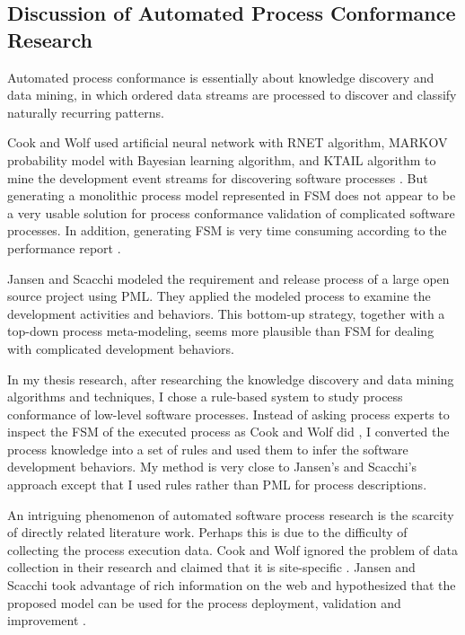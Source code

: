 \subsection{Discussion of Automated Process Conformance Research}
Automated process conformance is essentially about 
knowledge discovery and data mining, in which ordered 
data streams are processed to discover and classify 
naturally recurring patterns. 

Cook and Wolf used artificial neural network with RNET algorithm, 
MARKOV probability model with Bayesian 
learning algorithm, and KTAIL algorithm to mine the development 
event streams for discovering software processes \cite{Cook:95}. 
But generating a monolithic process model represented in FSM 
does not appear to be a very usable solution for process conformance 
validation of complicated software processes. In addition, 
generating FSM is very time consuming according to the 
performance report \cite{Cook:95}.

Jansen and Scacchi \cite{Jensen:04} modeled the requirement and 
release process of a large open source project using PML. They 
applied the modeled process to examine the development activities 
and behaviors. This bottom-up strategy, together with a top-down 
process meta-modeling, seems more plausible than FSM for dealing
with complicated development behaviors.  

In my thesis research, after researching the knowledge discovery
and data mining algorithms and techniques, I chose a rule-based
system to study process conformance of low-level software 
processes. Instead of asking process experts to inspect the
FSM of the executed process as Cook and Wolf did \cite{Cook:95}, 
I converted the process knowledge into a set of rules and used them 
to infer the software development behaviors. My method
is very close to Jansen's and Scacchi's approach \cite{Jensen:04} 
except that I used rules rather than PML for process descriptions. 

An intriguing phenomenon of automated software process research
is the scarcity of directly related literature work. Perhaps this 
is due to the difficulty of collecting the process execution data. 
Cook and Wolf ignored the problem of data collection in their 
research and claimed that it is site-specific \cite{Cook:95}. 
Jansen and Scacchi took advantage of rich information on the web 
and hypothesized that the proposed model can be used for the 
process deployment, validation and improvement \cite{Jensen:04}. 

